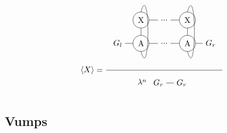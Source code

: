 \begin{equation}
    \Braket{X} = \frac{
        \begin{tikzpicture} [   ]
            \clip (-0.5,-1) rectangle (4.5,2);

            \node[] (N1) at (0,0) {$G_l$};
            \node[circle, draw] (N2) at (1,0) {A};
            \node[circle, draw] (X2) at (1,1) {X};

            \node[] (N3) at (2 ,0) {...};
            \node[] (X3) at (2,1) {...};

            \node[circle, draw] (N4) at (3 ,0) {A};
            \node[circle, draw] (X4) at (3,1) {X};

            \node[] (N5) at (4 ,0) {$G_r$};

            \draw  (N1) -- (N2) ;
            \draw  (N2) -- (N3) ;
            \draw  (N3) -- (N4) ;
            \draw  (N4) -- (N5) ;

            \draw  (X2) -- (X3) ;
            \draw  (X3) -- (X4) ;

            \draw  (N2) -- (X2) ;
            \draw  (N4) -- (X4) ;

            \draw (X2.north)   .. controls +(0.4,1.4) and +(0.4,-1.4) .. (N2.south);
            \draw (X4.north)   .. controls +(0.4,1.4) and +(0.4,-1.4) .. (N4.south);

        \end{tikzpicture}
    }{
        \lambda^n
        \begin{tikzpicture}[baseline={0cm-0.5*height("$=$")} ]
            \clip (-0.5,-0.5) rectangle (1.4,0.5);
            \node[] (N2) at (1,0) {$G_r$};
            \node[] (N1) at (0,0) {$G_r$};
            \draw  (N1) -- (N2) ;
        \end{tikzpicture}
    }
    \label{sm:expecatation_X_2}
\end{equation}

\subsection{Vumps}
\subsection{}